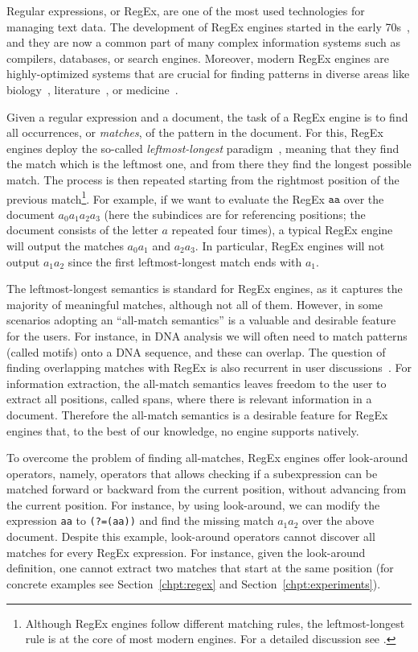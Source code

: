 
Regular expressions, or RegEx, are one of the most used technologies for managing text data. The development of RegEx engines started in the early 70s~\cite{thompson1968programming,earlyNFA}, and they are now a common part of many complex information systems such as compilers, databases, or search engines. Moreover, modern RegEx engines are highly-optimized systems that are crucial for finding patterns in diverse areas like biology~\cite{Gonzalo}, literature~\cite{lit1}, or medicine~\cite{FloresFP21}. 


Given a regular expression and a document, the task of a RegEx engine is to find all occurrences, or \emph{matches}, of the pattern in the document. For this, RegEx engines deploy the so-called \emph{leftmost-longest} paradigm~\cite{posix}, meaning that they find the match which is the leftmost one, and from there they find the longest possible match. The process is then repeated  starting from the rightmost position of the previous match\footnote{Although RegEx engines follow different matching rules, the leftmost-longest rule is at the core of most modern engines. For a detailed discussion see \cite{friedl2006mastering}.}. For example, if we want to evaluate the RegEx $\texttt{aa}$ over the document $a_0 a_1 a_2 a_3$ (here the subindices are for referencing positions; the document consists of the letter $a$ repeated four times), a typical RegEx engine will output the matches $a_0a_1$ and $a_2a_3$. In particular, RegEx engines will not output $a_1a_2$ since the first leftmost-longest match ends with $a_1$. 

The leftmost-longest semantics is standard for  RegEx engines, as it captures the majority of meaningful matches, although not all of them. However, in some scenarios adopting an ``all-match semantics'' is a valuable and desirable feature for the users. For instance, in DNA analysis we will often need to match patterns (called motifs) onto a DNA sequence, and these can overlap. The question of finding overlapping matches with RegEx is also recurrent in user discussions~\cite{overlap1,overlap2,overlap3}. For information extraction, the all-match semantics leaves freedom to the user to extract all positions, called spans, where there is relevant information in a document. Therefore the all-match semantics is a desirable feature for RegEx engines that, to the best of our knowledge, no engine supports natively.

To overcome the problem of finding all-matches, RegEx engines offer look-around operators, namely, operators that allows checking if a subexpression can be matched forward or backward from the current position, without advancing from the current position. For instance, by using look-around, we can modify the expression \texttt{aa} to \texttt{(?=(aa))} and find the missing match $a_1a_2$ over the above document. Despite this example, look-around operators cannot discover all matches for every RegEx expression. For instance, given the look-around definition, one cannot extract two matches that start at the same position (for concrete examples see Section~\ref{chpt:regex} and Section~\ref{chpt:experiments}).

